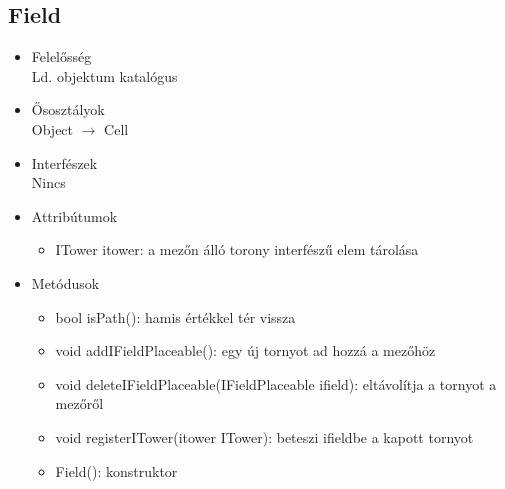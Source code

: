 \subsection{Field}
\begin{itemize}
\item Felelősség\\
Ld. objektum katalógus
\item Ősosztályok\\
Object $\rightarrow$ Cell
\item Interfészek\\
Nincs
\item Attribútumok\\
	\begin{itemize}
		\item ITower itower: a mezőn álló torony interfészű elem tárolása

		
	\end{itemize}
\item Metódusok\\
	\begin{itemize}
		
		\item bool isPath(): hamis értékkel tér vissza
		\item void addIFieldPlaceable(): egy új tornyot ad hozzá a mezőhöz
		\item void deleteIFieldPlaceable(IFieldPlaceable ifield): eltávolítja a tornyot a mezőről
		\item void registerITower(itower ITower): beteszi ifieldbe a kapott tornyot
		\item Field(): konstruktor
		
		
	\end{itemize}
\end{itemize}



